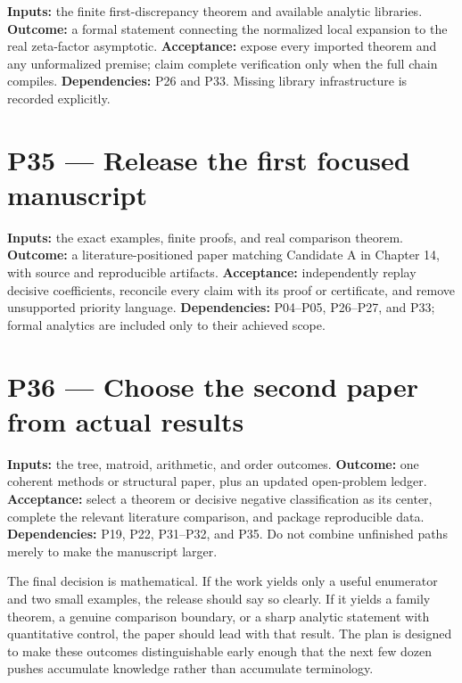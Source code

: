 \documentclass[
  11pt,
  a4paper,
]{report}
\begin{document}
\textbf{Inputs:} the finite first-discrepancy theorem and available
analytic libraries. \textbf{Outcome:} a formal statement connecting the
normalized local expansion to the real zeta-factor asymptotic.
\textbf{Acceptance:} expose every imported theorem and any unformalized
premise; claim complete verification only when the full chain compiles.
\textbf{Dependencies:} P26 and P33. Missing library infrastructure is
recorded explicitly.

\hypertarget{p35-release-the-first-focused-manuscript}{%
\section{P35 --- Release the first focused
manuscript}\label{p35-release-the-first-focused-manuscript}}

\textbf{Inputs:} the exact examples, finite proofs, and real comparison
theorem. \textbf{Outcome:} a literature-positioned paper matching
Candidate A in Chapter 14, with source and reproducible artifacts.
\textbf{Acceptance:} independently replay decisive coefficients,
reconcile every claim with its proof or certificate, and remove
unsupported priority language. \textbf{Dependencies:} P04--P05,
P26--P27, and P33; formal analytics are included only to their achieved
scope.

\hypertarget{p36-choose-the-second-paper-from-actual-results}{%
\section{P36 --- Choose the second paper from actual
results}\label{p36-choose-the-second-paper-from-actual-results}}

\textbf{Inputs:} the tree, matroid, arithmetic, and order outcomes.
\textbf{Outcome:} one coherent methods or structural paper, plus an
updated open-problem ledger. \textbf{Acceptance:} select a theorem or
decisive negative classification as its center, complete the relevant
literature comparison, and package reproducible data.
\textbf{Dependencies:} P19, P22, P31--P32, and P35. Do not combine
unfinished paths merely to make the manuscript larger.

The final decision is mathematical. If the work yields only a useful
enumerator and two small examples, the release should say so clearly. If
it yields a family theorem, a genuine comparison boundary, or a sharp
analytic statement with quantitative control, the paper should lead with
that result. The plan is designed to make these outcomes distinguishable
early enough that the next few dozen pushes accumulate knowledge rather
than accumulate terminology.
\end{document}
